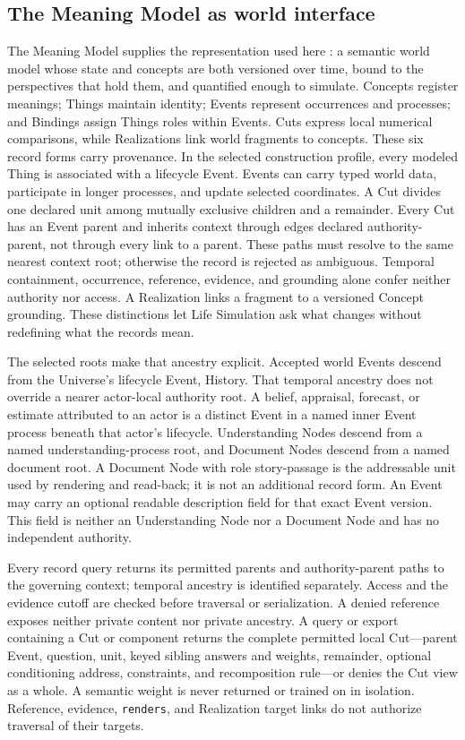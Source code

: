 \documentclass[10pt]{article}
\begin{document}
\subsection{The Meaning Model as world interface}
\label{sec:meaning-interface}

The Meaning Model supplies the representation used here
\cite{westerbergMeaning2026}: a semantic world model whose state and concepts
are both versioned over time, bound to the perspectives that hold them, and
quantified enough to simulate. Concepts register meanings; Things maintain
identity; Events represent occurrences and processes; and Bindings assign
Things roles within Events. Cuts express local numerical comparisons, while
Realizations link world fragments to concepts. These six record forms carry
provenance. In the selected construction profile, every modeled Thing is
associated with a lifecycle Event. Events can carry typed world data, participate in longer
processes, and update selected coordinates. A Cut divides one declared unit
among mutually exclusive children and a remainder. Every Cut has an Event
parent and inherits context through edges declared \textsf{authority-parent},
not through every link to a parent. These paths must resolve to the same
nearest context root; otherwise the record is rejected as ambiguous. Temporal
containment, occurrence, reference, evidence, and grounding alone confer
neither authority nor access. A Realization links a fragment to a versioned Concept grounding. These
distinctions let Life Simulation ask what changes without redefining what the
records mean.

The selected roots make that ancestry explicit. Accepted world Events descend
from the Universe's lifecycle Event, History. That temporal ancestry does not
override a nearer actor-local authority root. A belief, appraisal, forecast, or
estimate attributed to an actor is a distinct Event in a named inner Event
process beneath that actor's lifecycle. Understanding Nodes descend
from a named understanding-process root, and Document Nodes descend from a
named document root. A Document Node with role \textsf{story-passage} is the
addressable unit used by rendering and read-back; it is not an additional
record form. An Event may carry an optional readable description field for that
exact Event version. This field is neither an Understanding Node nor a Document
Node and has no independent authority.

Every record query returns its permitted parents and authority-parent paths to
the governing context; temporal ancestry is identified separately. Access and
the evidence cutoff are checked before traversal or serialization. A denied
reference exposes neither private content nor private ancestry. A query or
export containing a Cut or component returns the complete permitted local
Cut---parent Event, question, unit, keyed sibling answers and weights,
remainder, optional conditioning address, constraints, and recomposition
rule---or denies the Cut view as a whole. A semantic weight is never returned
or trained on in isolation. Reference, evidence, \texttt{renders}, and
Realization target links do not authorize traversal of their targets.
\end{document}
